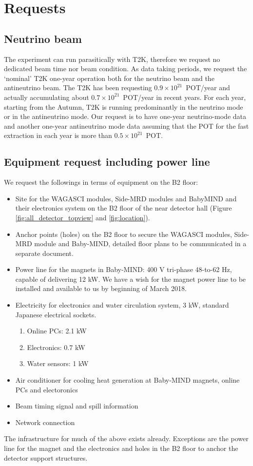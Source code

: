 \section{Requests}

\subsection{Neutrino beam}
The experiment can run parasitically with T2K, therefore we request no dedicated beam time nor beam condition.
As data taking periods, we request the `nominal' T2K one-year operation both for the neutrino beam and the antineutrino beam.
The T2K has been requesting $0.9\times10^{21}$~POT/year and actually accumulating about $0.7\times10^{21}$~POT/year in recent years.
For each year, starting from the Autumn,  T2K is running predominantly in the neutrino mode or in the antineutrino mode.
Our request is to have one-year neutrino-mode data and another one-year antineutrino mode data
assuming that the POT for the fast extraction in each year is more than $0.5\times10^{21}$~POT.

\subsection{Equipment request including power line}
We request the followings in terms of equipment on the B2 floor:
\begin{itemize}
\item {Site for the WAGASCI modules, Side-MRD modules and BabyMIND and their electronics system on the B2 floor of the near detector hall (Figure \ref{fig:all_detector_topview} and \ref{fig:location}).}
\item {Anchor points (holes) on the B2 floor to secure the WAGASCI modules, Side-MRD module and Baby-MIND, detailed floor plans to be communicated in a separate document.}
\item {Power line for the magnets in Baby-MIND: 400 V tri-phase 48-to-62 Hz, capable of delivering 12 kW. We have a wish for the magnet power line to be installed and available to us by beginning of March 2018.}
\item Electricity for electronics and water circulation system, 3 kW, standard Japanese electrical sockets.
	\begin{enumerate}
		\item Online PCs: 2.1 kW
		\item Electronics: 0.7 kW
		\item Water sensors: 1 kW
	\end{enumerate}
\item Air conditioner for cooling heat generation at Baby-MIND magnets, online PCs and electoronics
\item Beam timing signal and spill information
\item Network connection
\end{itemize}

The infrastructure for much of the above exists already.
Exceptions are the power line for the magnet and the electronics and holes in the B2 floor to anchor the detector support structures.

